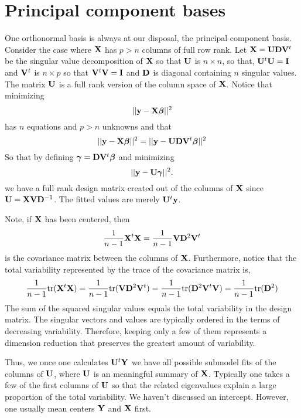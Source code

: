 \section{Principal component bases}

One orthonormal basis is always at our disposal, the principal component basis. 
Consider the case where $\mathbf{X}$ has $p > n$ columns of full row rank.
Let $\mathbf{X} = \mathbf{U} \mathbf{D} \mathbf{V}^t$ be the singular value decomposition of $\mathbf{X}$ so
that $\mathbf{U}$ is $n \times n$, so that, $\mathbf{U}^t \mathbf{U} = \mathbf{I}$ and $\mathbf{V}^t$
is $n\times p$ so that $\mathbf{V}^t \mathbf{V} = \mathbf{I}$ and $\mathbf{D}$ is diagonal containing
$n$ singular values. The matrix $\mathbf{U}$ is a full rank version of the
column space of $\mathbf{X}$. Notice that minimizing
$$
||\mathbf{y} - \mathbf{X} \boldsymbol{\beta}||^2
$$
has $n$ equations and $p>n$ unknowns and that
$$
||\mathbf{y} - \mathbf{X} \boldsymbol{\beta}||^2
= 
||\mathbf{y} -  \mathbf{U} \mathbf{D} \mathbf{V}^t \boldsymbol{\beta}||^2
$$
So that by defining $\boldsymbol{\gamma} = \mathbf{D} \mathbf{V}^t \boldsymbol{\beta}$ and minimizing 
$$
||\mathbf{y} -  \mathbf{U} \boldsymbol{\gamma}||^2.
$$
we have a full rank design matrix created out of the columns of $\mathbf{X}$ since
$\mathbf{U} = \mathbf{X} \mathbf{V} \mathbf{D}^{-1}$. 
The fitted values are merely $\mathbf{U}^t \mathbf{y}$.

Note, if $\mathbf{X}$ has been centered, then 
$$
\frac{1}{n-1} \mathbf{X}^t \mathbf{X} = \frac{1}{n-1} \mathbf{V} \mathbf{D}^2 \mathbf{V}^t
$$
is the covariance matrix between the columns of $\mathbf{X}$. Furthermore,
notice that the total variability represented by the trace of the covariance
matrix is, 
$$\frac{1}{n-1} \mbox{tr}(\mathbf{X}^t \mathbf{X})
= \frac{1}{n-1} \mbox{tr}(\mathbf{V} \mathbf{D}^2 \mathbf{V}^t)
=\frac{1}{n-1} \mbox{tr}(\mathbf{D}^2 \mathbf{V}^t \mathbf{V})
= \frac{1}{n-1} \mbox{tr}(\mathbf{D}^2)
$$
The sum of the squared singular values equals the total variability in the
design matrix. 
The singular
vectors and values are typically ordered in the terms of decreasing
variability. Therefore, keeping only a few of them represents a dimension
reduction that preserves the greatest amount of variability.

Thus, we once one calculates $\mathbf{U}^t \mathbf{Y}$ we have all possible submodel
fits of the columns of $\mathbf{U}$, where $\mathbf{U}$ is an meaningful summary
of $\mathbf{X}$. Typically one takes a few of the first columns of $\mathbf{U}$
so that the related eigenvalues explain a large proportion of the
total variability. We haven't discussed an intercept. However, 
one usually mean centers $\mathbf{Y}$ and $\mathbf{X}$ first.




